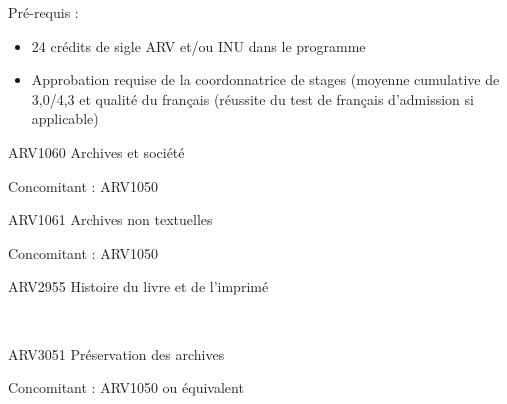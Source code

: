 \documentclass [12 pt]{article}
\begin{document}
                            
                                
                                    Pré-requis :
                                
                                
        \begin{itemize}
        
                                    
        \item 24 crédits de sigle ARV et/ou INU dans le programme
                                    
        \item Approbation requise de la coordonnatrice de stages (moyenne
                                        cumulative de 3,0/4,3 et qualité du français (réussite du
                                        test de français d'admission si applicable)
                                
        \end{itemize}
    
                            
                        
                        
                            
                                ARV1060 Archives et société
                            
                            
                                Concomitant : ARV1050
                            
                        
                        
                            
                                ARV1061 Archives non textuelles
                            
                            
                                Concomitant : ARV1050
                            
                        
                        
                            
                                ARV2955 Histoire du livre et de l'imprimé
                            
                             
                        
                        
                            
                                ARV3051 Préservation des archives
                            
                            
                                Concomitant : ARV1050 ou équivalent
                            
\end{document}

